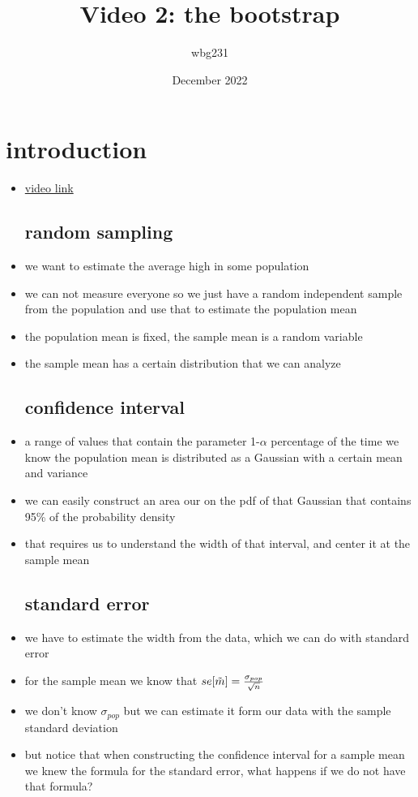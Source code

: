 \documentclass{article}
\title{Video 2: the bootstrap}
\author{wbg231 }
\date{December 2022}
\begin{document}
\maketitle

\section{introduction}
\begin{itemize}
\item \href{https://www.youtube.com/watch?v=yeiMMzjDTWs&list=PLBEf5mJtE6KuZ5NBQMuWIMsiOOrV9ibzm&index=75}{video link}
\subsection{random sampling}
\item we want to estimate the average high in some population
\item we can not measure everyone so we just have a random  independent sample from the population and use that to estimate the population mean
\item the population mean is fixed, the sample mean is a random variable
\item the sample mean has a certain distribution that we can analyze
\subsection{confidence interval}
\item a range of values that contain the parameter 1-$\alpha$ percentage of the time 
\itme we know the population mean is distributed as a Gaussian with a certain mean and variance 
\item we can easily construct an area our on the pdf of that Gaussian that contains 95\% of the probability density
\item that requires us to understand the width of that interval, and center it at the sample mean
\subsection{standard error}
\item we have to estimate the width from the data, which we can do with standard error
\item for the sample mean we know that $se[\Tilde{m}]=\frac{\sigma_{pop}}{\sqrt{n}}$ \item we don't know $\sigma_{pop}$ but we can estimate it form our data with the sample standard deviation 
\item but notice that when constructing the confidence interval for a sample mean we knew the formula for the standard error, what happens if we do not have that formula?

\end{itemize}
\end{document}
